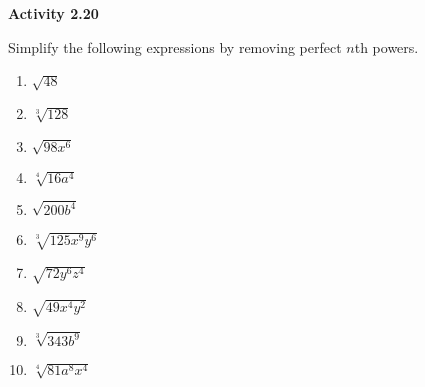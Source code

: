 \vspace{1ex}
\noindent\textbf{Activity 2.20}

\vspace{0.75ex}

Simplify the following expressions by removing perfect \(n\)th powers.

\begin{multicols}{2}
\begin{enumerate}[noitemsep, label = \color{blue}\arabic*. ]
    \item $\sqrt{48}$
    \item $\sqrt[{\scriptstyle 3}]{128}$
    \item $\sqrt{98x^6}$
    \item $\sqrt[{\scriptstyle 4}]{16a^4}$
    \item $\sqrt{200b^4}$
    \item $\sqrt[{\scriptstyle 3}]{125x^9y^6}$
    \item $\sqrt{72y^6z^4}$
    \item $\sqrt{49x^4y^2}$
    \item $\sqrt[{\scriptstyle 3}]{343b^9}$
    \item $\sqrt[{\scriptstyle 4}]{81a^8x^4}$
\end{enumerate}
\end{multicols}

